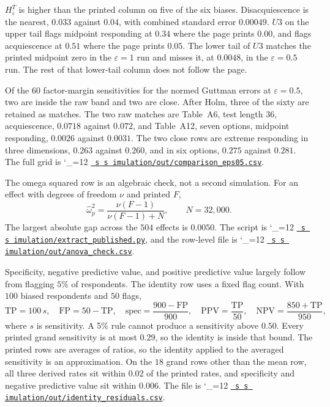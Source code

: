 \documentclass[11pt]{article}
\makeatletter
\newcommand{\proofbase}{https://github.com/alectionary/vibe-math/blob/master/formalization/polytomous-person-fit}
\def\pf@show#1{%
  \ifx\relax#1\else
    #1\allowbreak
    \expandafter\pf@show
  \fi}
\newcommand{\src}{\begingroup\catcode`\_=12 \pf@src}
\newcommand{\pf@src}[1]{%
  \edef\srcurl{\proofbase/#1}%
  \href{\srcurl}{\texttt{\pf@show#1\relax}}\endgroup}
\makeatother
\begin{document}
\(H_i^T\) is higher than the printed column on five of the six biases.
Disacquiescence is the nearest, \(0.033\) against \(0.04\), with combined
standard error \(0.00049\).
\(U3\) on the upper tail flags midpoint responding at \(0.34\) where the
page prints \(0.00\), and flags acquiescence at \(0.51\) where the page
prints \(0.05\).
The lower tail of \(U3\) matches the printed midpoint zero in the
\(\varepsilon=1\) run and misses it, at \(0.0048\), in the
\(\varepsilon=0.5\) run.
The rest of that lower-tail column does not follow the page.

Of the \(60\) factor-margin sensitivities for the normed Guttman errors
at \(\varepsilon=0.5\), two are inside the raw band and two are close.
After Holm, three of the sixty are retained as matches.
The two raw matches are Table~A6, test length \(36\), acquiescence,
\(0.0718\) against \(0.072\), and Table~A12, seven options, midpoint
responding, \(0.0026\) against \(0.0031\).
The two close rows are extreme responding in three dimensions, \(0.263\)
against \(0.260\), and in six options, \(0.275\) against \(0.281\).
The full grid is \src{simulation/out/comparison_eps05.csv}.

The omega squared row is an algebraic check, not a second simulation.
For an effect with degrees of freedom \(\nu\) and printed \(F\),
\[
\hat\omega^2_p=\frac{\nu(F-1)}{\nu(F-1)+N},\qquad N=32{,}000.
\]
The largest absolute gap across the \(504\) effects is \(0.0050\).
The script is \src{simulation/extract_published.py}, and the row-level
file is \src{simulation/out/anova_check.csv}.

Specificity, negative predictive value, and positive predictive value
largely follow from flagging \(5\%\) of respondents.
The identity row uses a fixed flag count.
With \(100\) biased respondents and \(50\) flags,
\[
\mathrm{TP}=100\,s,\quad
\mathrm{FP}=50-\mathrm{TP},\quad
\mathrm{spec}=\frac{900-\mathrm{FP}}{900},\quad
\mathrm{PPV}=\frac{\mathrm{TP}}{50},\quad
\mathrm{NPV}=\frac{850+\mathrm{TP}}{950},
\]
where \(s\) is sensitivity.
A 5\% rule cannot produce a sensitivity above \(0.50\).
Every printed grand sensitivity is at most \(0.29\), so the identity is
inside that bound.
The printed rows are averages of ratios, so the identity applied to the
averaged sensitivity is an approximation.
On the \(18\) grand rows other than the mean row, all three derived
rates sit within \(0.02\) of the printed rates, and specificity and
negative predictive value sit within \(0.006\).
The file is \src{simulation/out/identity_residuals.csv}.
\end{document}

